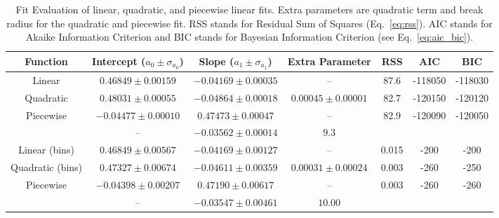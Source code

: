 
\begin{table*}
\caption{
Fit Evaluation of linear, quadratic, and piecewise linear fits.
Extra parameters are quadratic term and break radius for the quadratic and piecewise fit.
RSS stands for Residual Sum of Squares (Eq.~\ref{eq:rss}).
AIC stands for Akaike Information Criterion and BIC stands for Bayesian Information Criterion (see Eq.~\ref{eq:aic_bic}).
}
\label{tab:global_fit_results_comparison}
\begin{tabular}{ccccccc}
\hline
Function & Intercept ($a_0 \pm \sigma_{a_0}$) & Slope ($a_1 \pm \sigma_{a_1}$) & Extra Parameter & RSS & AIC & BIC \\
\hline
Linear & $0.46849 \pm 0.00159$  & $-0.04169 \pm 0.00035$ & -- & 87.6 & -118050  & -118030 \\ 
Quadratic & $0.48031 \pm 0.00055$  & $-0.04864 \pm 0.00018$ & $0.00045 \pm 0.00001$ & 82.7 & -120150  & -120120 \\ 
Piecewise & $-0.04477 \pm 0.00010$ & $0.47473 \pm 0.00047$ & -- & 82.9 & -120090  & -120050 \\ 
 & -- & $-0.03562 \pm 0.00014$ & $9.3$ & & & \\ 
\hline
Linear (bins)& $0.46849 \pm 0.00567$  & $-0.04169 \pm 0.00127$ & -- & 0.015 & -200  & -200 \\ 
Quadratic (bins) & $0.47327 \pm 0.00674$  & $-0.04611 \pm 0.00359$ & $0.00031 \pm 0.00024$ & 0.003 & -260  & -250 \\ 
Piecewise & $-0.04398 \pm 0.00207$ & $0.47190 \pm 0.00617$ & -- & 0.003 & -260  & -260 \\ 
 & -- & $-0.03547 \pm 0.00461$ & $10.00$ & & & \\ 
\hline
\end{tabular}
\end{table*}
